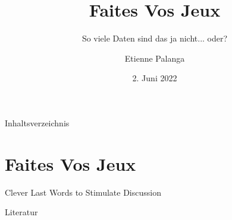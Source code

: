 \documentclass[aspectratio=169,10pt, notes]{beamer}
\title{Faites Vos Jeux}
\subtitle{So viele Daten sind das ja nicht... oder?}
\author{Etienne Palanga}
\date{2. Juni 2022}
\institute{TU Dortmund - Fakultät Informatik}
\begin{document}
\maketitle

\begin{frame}{Inhaltsverzeichnis}
    \tableofcontents
\end{frame}

\section{Faites Vos Jeux \cite{kees_faites_2017}}





  

\begin{frame}[t,standout]
\Large
Clever Last Words to Stimulate Discussion
\end{frame}

\nocite{kees_faites_2017}
\nocite{lee_ethical_2016}
\nocite{zankl_international_2014}

\begin{frame}{Literatur}
\printbibliography[heading=none]
\end{frame}
\end{document}
